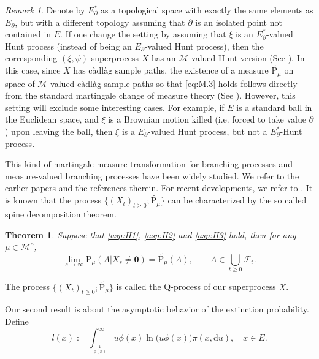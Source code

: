 \documentclass[12pt,a4paper]{amsart}
\numberwithin{equation}{section}
\theoremstyle{plain}
\newtheorem{thm}{Theorem}[section]
\theoremstyle{definition}
\theoremstyle{remark}
\newtheorem{remark}{Remark}
\begin{document}
\begin{remark}
	Denote by $E_\partial^*$ as a topological space with exactly the same elements as $E_\partial$, but with a different topology assuming that $\partial$ is an isolated point not contained in $E$.
	If one change the setting by assuming that $\xi$ is an $E_\partial^*$-valued Hunt process (instead of being an $E_\partial$-valued Hunt process), then the corresponding $(\xi,\psi)$-superprocess $X$ has an $\mathcal M$-valued Hunt version (See \cite[Theorem 5.12]{Li2011Measure-valued}).
	In this case, since $X$ has c\`adl\`ag sample paths, the existence of a measure $\widetilde {\mathrm P_\mu}$ on space of $\mathcal M$-valued c\`adl\`ag sample paths so that \eqref{eq:M.3} holds follows directly from the standard martingale change of measure theory (See \cite[Lemma 18.18]{Kallenberg2002Foundations}).
	However, this setting will exclude some interesting cases. For example, if $E$ is a standard ball in the Euclidean space, and $\xi$ is a Brownian motion killed (i.e. forced to take value $\partial$) upon leaving the ball, then $\xi$ is a $E_\partial$-valued Hunt process, but not a $E_\partial^*$-Hunt process.
\end{remark}


	
	This kind of martingale measure transformation for branching processes and measure-valued branching processes have been widely studied.
	We refer to the earlier papers {\color{red}\cite{EnglanderKyprianou2004Local,Evans1993Two,Penisson2010Conditional,RoellyRouault1989Processus}}
and the references therein.
	For recent developments, we refer to \cite{ChampagnatRoelly2008Limit,RenSongSun2020Spine,RenSongZhang2018Williams}.
	It is known that the process $\{(X_t)_{t\geq 0}; \widetilde{\mathrm P_\mu}\}$ can be characterized by the so called spine decomposition theorem.
	


	\begin{thm} \label{thm:Q}
	Suppose that \eqref{asp:H1}, \eqref{asp:H2} and \eqref{asp:H3} hold, then
	for any $\mu \in \mathcal M^o$,
\[
	\lim_{s \rightarrow \infty} \mathrm P_\mu(A |X_s\neq \mathbf 0)=
	\widetilde{\mathrm P_\mu}(A),
	\qquad 
	A\in \bigcup_{t\geq 0}\mathscr F_t.
\]
\end{thm}
The process  $\{(X_t)_{t\geq 0}; \widetilde{\mathrm P_\mu}\}$  is called the  Q-process of our superprocess $X$.

	Our second result is about the asymptotic behavior of the extinction probability.
	Define
\begin{equation}\label{eq:M.35}
	l(x)
	:= \int_{\frac{1}{\phi(x)}}^\infty u\phi(x) \ln \big(u\phi(x)\big) \pi(x, \mathrm du),
	\quad x\in E.
\end{equation}
\end{document}
